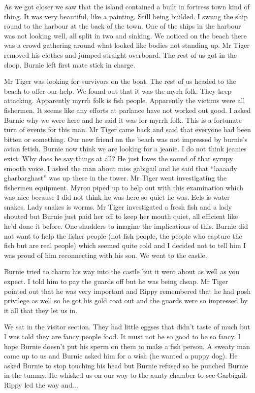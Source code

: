 As we got closer we saw that the island contained a built in fortress town kind of thing. It was very beautiful, like a painting. Still being builded. I swung the ship round to the harbour at the back of the town. One of the ships in the harbour was not looking well, all split in two and sinking. We noticed on the beach there was a crowd gathering around what looked like bodies not standing up. Mr Tiger removed his clothes and jumped straight overboard. The rest of us got in the sloop. Burnie left first mate stick in charge.\medskip

Mr Tiger was looking for survivors on the boat. The rest of us headed to the beach to offer our help. We found out that it was the myrh folk. They keep attacking. Apparently myrrh folk is fish people. Apparently the victims were all fishermen. It seems like any efforts at parlance have not worked out good. I asked Burnie why we were here and he said it was for myrrh folk. This is a fortunate turn of events for this man. Mr Tiger came back and said that everyone had been bitten or something. Our new friend on the beach was not impressed by burnie’s avian fetish. Burnie now think we are looking for a jeanie. I do not think jeanies exist. Why does he say things at all? He just loves the sound of that syrupy smooth voice. I asked the man about miss gabigail and he said that “laaaady gharbarghast” was up there in the tower. Mr Tiger went investigating the fishermen equipment. Myron piped up to help out with this examination which was nice because I did not think he was here so quiet he was. Eels is water snakes. Lady snakes is worms. Mr Tiger investigated a fresh fish and a lady shouted but Burnie just paid her off to keep her mouth quiet, all efficient like he’d done it before. One shudders to imagine the implications of this. Burnie did not want to help the fisher people (not fish people, the people who capture the fish but are real people) which seemed quite cold and I decided not to tell him I was proud of him reconnecting with his son. We went to the castle.\medskip

Burnie tried to charm his way into the castle but it went about as well as you expect. I told him to pay the guards off but he was being cheap. Mr Tiger pointed out that he was very important and Rippy remembered that he had posh privilege as well so he got his gold coat out and the guards were so impressed by it all that they let us in.\medskip

We sat in the visitor section. They had little eggses that didn’t taste of much but I was told they are fancy people food. It must not be so good to be so fancy. I hope Burnie doesn’t put his sperm on them to make a fish person. A sweaty man came up to us and Burnie asked him for a wish (he wanted a puppy dog). He asked Burnie to stop touching his head but Burnie refused so he punched Burnie in the tummy. He whisked us on our way to the aunty chamber to see Garbigail. Rippy led the way and...\medskip

